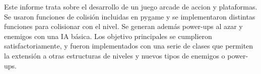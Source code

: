 %
%


Este informe trata sobre el desarrollo de un juego arcade de accion y plataformas. Se usaron funciones de colisión incluidas en pygame y se implementaron distintas funciones para colisionar con el nivel. Se generan además power-ups al azar y enemigos con una IA básica. Los objetivo principales se cumplieron satisfactoriamente, y fueron implementados con una serie de clases que permiten la extensión a otras estructuras de niveles y nuevos tipos de enemigos o power-ups.